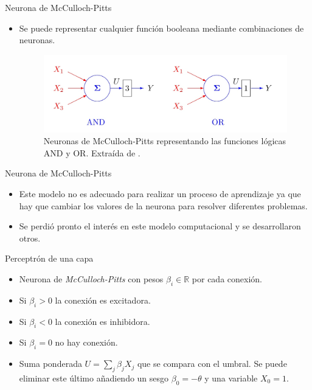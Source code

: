 \documentclass[spanish]{beamer}
\begin{document}
\begin{frame}{Neurona de McCulloch-Pitts}
  \begin{itemize}
    \item Se puede representar cualquier función booleana mediante combinaciones de neuronas.

    \vspace{1em}

    \begin{figure}[h]
    \centering
    \includegraphics[width=.8\textwidth]{img/and-or}
    \caption{Neuronas de McCulloch-Pitts representando las funciones lógicas AND y OR. Extraída de \parencite{izenman_modern_2008}.}
    \label{fig:and-or}
  \end{figure}
  \end{itemize}
\end{frame}

\begin{frame}{Neurona de McCulloch-Pitts}
  \begin{itemize}
    \item Este modelo no es adecuado para realizar un proceso de aprendizaje ya que hay que cambiar los valores de la neurona para resolver diferentes problemas.
    \item Se perdió pronto el interés en este modelo computacional y se desarrollaron otros.
  \end{itemize}
\end{frame}

\begin{frame}{Perceptrón de una capa}
  \begin{itemize}
    \item Neurona de \textit{McCulloch-Pitts} con pesos $\beta_i \in \mathbb{R}$ por cada conexión.
    \item Si $\beta_i > 0$ la conexión es excitadora.
    \item Si $\beta_i < 0$ la conexión es inhibidora.
    \item Si  $\beta_i = 0$ no hay conexión.
    \item Suma ponderada $U = \sum_j \beta_j X_j$ que se compara con el umbral. Se puede eliminar este último añadiendo un sesgo $\beta_0 = - \theta$ y una variable $X_0 = 1$.
  \end{itemize}
\end{frame}
\end{document}
